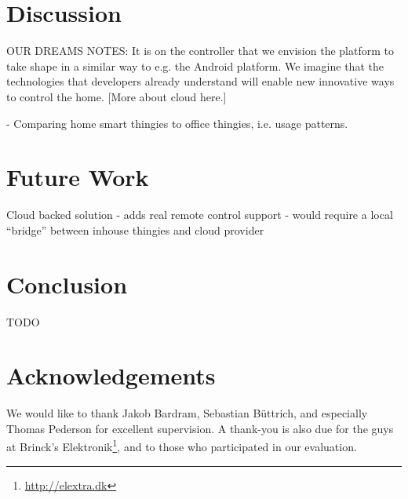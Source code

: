\documentclass{ubicomp2012}
\begin{document}
\section{Discussion}

OUR DREAMS NOTES: It is on the controller that we envision the platform to take shape in a similar way to e.g. the Android platform. We imagine that the technologies that developers already understand will enable new innovative ways to control the home. [More about cloud here.]

- Comparing home smart thingies to office thingies, i.e. usage patterns.

\section{Future Work}

Cloud backed solution
- adds real remote control support
- would require a local ``bridge'' between inhouse thingies and cloud provider

\section{Conclusion}

TODO

\section{Acknowledgements}

We would like to thank Jakob Bardram, Sebastian B\"{u}ttrich, and especially Thomas Pederson for excellent supervision. A thank-you is also due for the guys at Brinck's Elektronik\footnote{\url{http://elextra.dk}}, and to those who participated in our evaluation.



\end{document}
